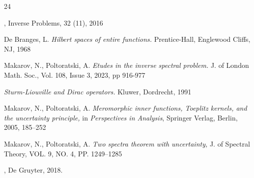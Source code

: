 \documentclass[11pt,twoside,reqno]{amsart}
\theoremstyle{plain}
\numberwithin{equation}{section}
\begin{document}
 \begin{thebibliography}{24}
 
 
 ,    Inverse Problems, 32 (11), 2016
 
   {\sc De Branges, L.} {\it Hilbert spaces of entire functions.} Prentice-Hall,
 Englewood Cliffs, NJ, 1968
 
   {\sc Makarov, N., Poltoratski, A.} {\it Etudes in the inverse spectral problem.} J. of London Math. Soc., Vol. 108, Issue 3, 2023, pp 916-977 
 
  {\em Sturm-Liouville and Dirac operators.} Kluwer, Dordrecht, 1991
 
  {\sc  Makarov, N.,  Poltoratski, A.} {\it Meromorphic inner functions, Toeplitz kernels, and the uncertainty principle,} in {\it Perspectives in Analysis}, Springer Verlag, Berlin, 2005, 185--252
 
  {{\sc    Makarov, N.,  Poltoratski, A.} {\it Two spectra theorem with uncertainty,}} J. of Spectral Theory, VOL. 9, NO. 4, PP. 1249–1285
 
 ,
 De Gruyter, 2018. 
 
 
 
\end{thebibliography}
 
 
\end{document}
